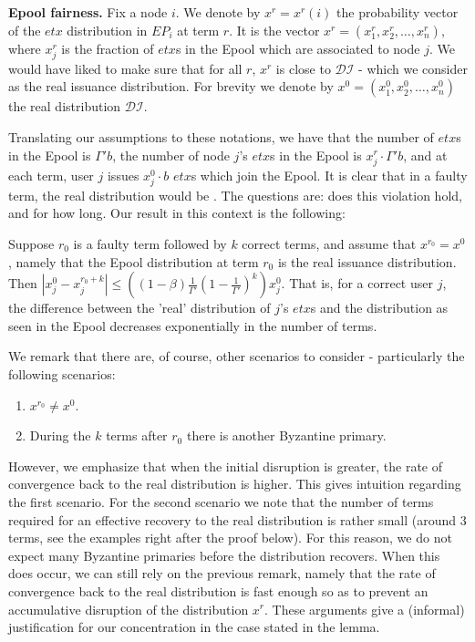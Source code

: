 \textbf{Epool fairness.} Fix a node $i$. We denote by $x^r=x^r(i)$ the probability vector of the $etx$ distribution in $EP_i$ at term $r$. It is the vector $x^r=(x^r_1,x^r_2,\dots,x^r_n)$, where $x^r_j$ is the fraction of $etx$s in the Epool which are associated to node $j$. We would have liked to make sure that for all $r$, $x^r$ is close to $\mathcal{DI}$ - which we consider as the real issuance distribution. For brevity we denote by $x^0=(x_1^0,x_2^0,\dots,x_n^0)$ the real distribution $\mathcal{DI}$. 

Translating our assumptions to these notations, we have that the number of $etx$s in the Epool is $\Gamma' b$, the number of node $j$'s $etx$s in the Epool is $x^r_j\cdot \Gamma' b$, and at each term, user $j$ issues $x^0_j\cdot b$ $etx$s which join the Epool.  It is clear that in a faulty term, the real distribution would be . The questions are: does this violation hold, and for how long. Our result in this context is the following:

\begin{lemma}
    Suppose $r_0$ is a faulty term followed by $k$ correct terms, and assume that $x^{r_0}=x^0$, namely that the Epool distribution at term $r_0$ is the real issuance distribution. Then $|x_j^0-x^{r_0+k}_j|\leq((1-\beta)\frac{1}{\Gamma'}(1-\frac{1}{\Gamma'})^k)x^0_j$. That is, for a correct user $j$, the difference between the 'real' distribution of $j$'s $etx$s and the distribution as seen in the Epool decreases exponentially in the number of terms.
\end{lemma}

We remark that there are, of course, other scenarios to consider - particularly the following scenarios: 
\begin{enumerate}
\item $x^{r_0}\ne x^0$.
\item During the $k$ terms after $r_0$ there is another Byzantine primary.
\end{enumerate}
However, we emphasize that when the initial disruption is greater, the rate of convergence back to the real distribution is higher. This gives intuition regarding the first scenario. For the second scenario we note that the number of terms required for an effective recovery to the real distribution is rather small (around 3 terms, see the examples right after the proof below). For this reason, we do not expect many Byzantine primaries before the distribution recovers. When this does occur, we can still rely on the previous remark, namely that the rate of convergence back to the real distribution is fast enough so as to prevent an accumulative disruption of the distribution $x^r$. These arguments give a (informal) justification for our concentration in the case stated in the lemma.

